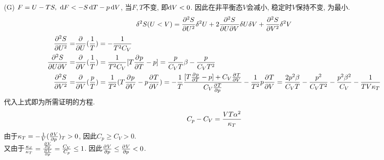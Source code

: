 \documentclass[UTF8,9pt]{ctexart}
\begin{document}
(G) $F=U-TS,\ \d F < -S\d T-p\d V$, 当$F,T$不变, 即$\d V < 0$. 因此在非平衡态$V$会减小, 稳定时$V$保持不变, 为最小.
$$\de^2 S(U<V) = \pp[2]{S}{U}\de^2 U+2\frac{\partial^2 S}{\partial U\partial V}\de U\de V+\pp[2]{S}{V}\de^2 V$$
$$ \ar{
    \pp[2]{S}{U} =& \pp{}{U}(\ff{T})=-\ff{T^2C_V}\\
    \frac{\partial^2 S}{\partial U\partial V} =& \pp{}{V}(\ff{T}) = \ff{T^2C_V}[T\pp{p}{T}-p]=\f{p}{C_VT}\beta-\f{p}{C_VT^2}\\
    \pp[2]{S}{V} =& \pp{}{V}(\f{p}{T}) = \ff{T^2}(T\pp{p}{V}-p\pp{T}{V}) = -\ff{T}\f{[T\pp{p}{T}-p]+C_V\pp{T}{V}}{C_V\pp{T}{p}}-\ff{T^2}p\pp{T}{V}=\f{2p^2\beta}{C_VT}-\f{p^2}{C_VT^2}-\f{p^2\beta^2}{C_V}-\ff{TV\kappa_T}
}$$
代入上式即为所需证明的方程.
\qqed
{}
$$C_p-C_V=\f{VT\a^2}{\kappa_T}$$
由于$\kappa_T=-\ff{V}(\pp{V}{p})_T>0$, 因此$C_p\geq C_V>0$.\\
又由于$\f{\kappa_S}{\kappa_T}=\f{\pp{V}{p}}{\pp{V}{p}}=\f{C_V}{C_p}\leq 1$. 因此$\pp{V}{p} \leq \pp{V}{p}<0$.
\end{document}
